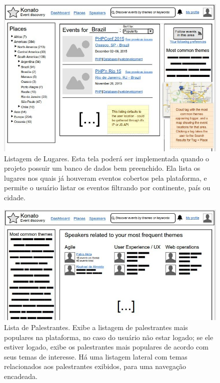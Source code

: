 \documentclass[12pt,a4paper,twoside,hyphens,english,brazil]{abntex2}
\begin{document}
{\begin{figure}[h]
\vspace{1cm}
\centering
	\includegraphics[width=1\linewidth]{imagens/prototipos/1-2_Listing_by_places.jpg}
	\caption[Listagem de Lugares]{Listagem de Lugares. Esta tela poderá ser implementada quando o projeto possuir um banco de dados bem preenchido. Ela lista os lugares nos quais já houveram eventos cobertos pela plataforma, e permite o usuário listar os eventos filtrando por continente, país ou cidade.}
	\label{prot:list-places}
\end{figure}

\begin{figure}[h]
\centering
	\includegraphics[width=1\linewidth]{imagens/prototipos/1-5-0_Speakers_list.jpg}
	\caption[Lista de Palestrantes]{Lista de Palestrantes. Exibe a listagem de palestrantes mais populares na plataforma, no caso do usuário não estar logado; se ele estiver logado, exibe os palestrantes mais populares de acordo com seus temas de interesse. Há uma listagem lateral com temas relacionados aos palestrantes exibidos, para uma navegação encadeada.}
	\label{prot:list-speakers}
\end{figure}

}
\end{document}
